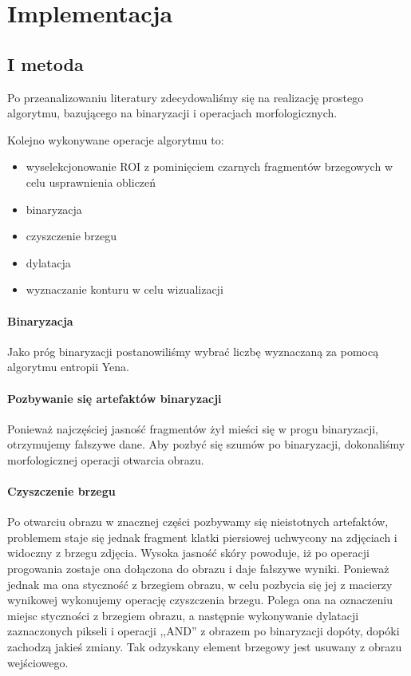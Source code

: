 \documentclass[11pt,openany]{sprawozdanie-agh}
\begin{document}
\section{Implementacja}
\subsection{I metoda}
Po przeanalizowaniu literatury zdecydowaliśmy się na realizację prostego algorytmu, bazującego na binaryzacji i operacjach morfologicznych.

Kolejno wykonywane operacje algorytmu to:
\begin{itemize}
\item wyselekcjonowanie ROI z pominięciem czarnych fragmentów brzegowych w celu usprawnienia obliczeń
\item binaryzacja
\item czyszczenie brzegu
\item dylatacja
\item wyznaczanie konturu w celu wizualizacji
\end{itemize}

\paragraph{Binaryzacja\\}
Jako próg binaryzacji postanowiliśmy wybrać liczbę wyznaczaną za pomocą algorytmu entropii Yena.

\paragraph{Pozbywanie się artefaktów binaryzacji\\}
Ponieważ najczęściej jasność fragmentów żył mieści się w progu binaryzacji, otrzymujemy fałszywe dane. Aby pozbyć się szumów po binaryzacji, dokonaliśmy morfologicznej operacji otwarcia obrazu.

\paragraph{Czyszczenie brzegu\\}
Po otwarciu obrazu w znacznej części pozbywamy się nieistotnych artefaktów, problemem staje się jednak fragment klatki piersiowej uchwycony na zdjęciach i widoczny z brzegu zdjęcia. Wysoka jasność skóry powoduje, iż po operacji progowania zostaje ona dołączona do obrazu i daje fałszywe wyniki. Ponieważ jednak ma ona styczność z brzegiem obrazu, w celu pozbycia się jej z macierzy wynikowej wykonujemy operację czyszczenia brzegu.
Polega ona na oznaczeniu miejsc styczności z brzegiem obrazu, a następnie wykonywanie dylatacji zaznaczonych pikseli i operacji ,,AND'' z obrazem po binaryzacji dopóty, dopóki zachodzą jakieś zmiany. Tak odzyskany element brzegowy jest usuwany z obrazu wejściowego.
\end{document}
